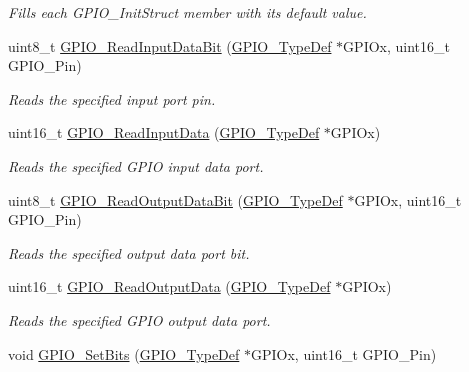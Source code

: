 \begin{DoxyCompactItemize}
\begin{DoxyCompactList}\small\item\em Fills each G\+P\+I\+O\+\_\+\+Init\+Struct member with its default value. \end{DoxyCompactList}\item 
uint8\+\_\+t \mbox{\hyperlink{group___g_p_i_o___exported___functions_ga98772ef6b639b3fa06c8ae5ba28d3aaa}{G\+P\+I\+O\+\_\+\+Read\+Input\+Data\+Bit}} (\mbox{\hyperlink{struct_g_p_i_o___type_def}{G\+P\+I\+O\+\_\+\+Type\+Def}} $\ast$G\+P\+I\+Ox, uint16\+\_\+t G\+P\+I\+O\+\_\+\+Pin)
\begin{DoxyCompactList}\small\item\em Reads the specified input port pin. \end{DoxyCompactList}\item 
uint16\+\_\+t \mbox{\hyperlink{group___g_p_i_o___exported___functions_ga139a33adc8409288e9f193bbebb5a0f7}{G\+P\+I\+O\+\_\+\+Read\+Input\+Data}} (\mbox{\hyperlink{struct_g_p_i_o___type_def}{G\+P\+I\+O\+\_\+\+Type\+Def}} $\ast$G\+P\+I\+Ox)
\begin{DoxyCompactList}\small\item\em Reads the specified G\+P\+IO input data port. \end{DoxyCompactList}\item 
uint8\+\_\+t \mbox{\hyperlink{group___g_p_i_o___exported___functions_ga138270f8695b105b7c6ed405792919c1}{G\+P\+I\+O\+\_\+\+Read\+Output\+Data\+Bit}} (\mbox{\hyperlink{struct_g_p_i_o___type_def}{G\+P\+I\+O\+\_\+\+Type\+Def}} $\ast$G\+P\+I\+Ox, uint16\+\_\+t G\+P\+I\+O\+\_\+\+Pin)
\begin{DoxyCompactList}\small\item\em Reads the specified output data port bit. \end{DoxyCompactList}\item 
uint16\+\_\+t \mbox{\hyperlink{group___g_p_i_o___exported___functions_gaf8938a34280b7dc3e39872a7c17bb323}{G\+P\+I\+O\+\_\+\+Read\+Output\+Data}} (\mbox{\hyperlink{struct_g_p_i_o___type_def}{G\+P\+I\+O\+\_\+\+Type\+Def}} $\ast$G\+P\+I\+Ox)
\begin{DoxyCompactList}\small\item\em Reads the specified G\+P\+IO output data port. \end{DoxyCompactList}\item 
void \mbox{\hyperlink{group___g_p_i_o___exported___functions_ga9e1352eed7c6620e18af2d86f6b6ff8e}{G\+P\+I\+O\+\_\+\+Set\+Bits}} (\mbox{\hyperlink{struct_g_p_i_o___type_def}{G\+P\+I\+O\+\_\+\+Type\+Def}} $\ast$G\+P\+I\+Ox, uint16\+\_\+t G\+P\+I\+O\+\_\+\+Pin)

\end{DoxyCompactItemize}
